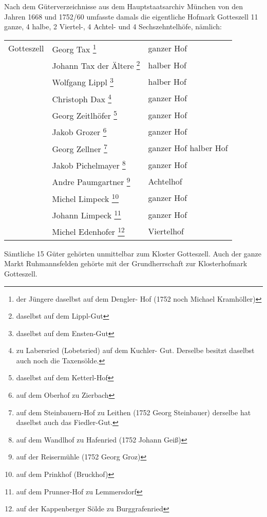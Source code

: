 \documentclass{book}
\begin{document}
Nach dem Güterverzeichnisse aus dem Hauptstaatsarchiv München von den
Jahren 1668 und 1752/60 umfasste damals die eigentliche Hofmark
Gotteszell 11 ganze, 4 halbe, 2 Viertel-, 4 Achtel- und 4
Sechszehntelhöfe, nämlich:

\begin{longtable}{l|l|l}
Gotteszell & Georg Tax \footnote{der Jüngere daselbst auf dem Dengler-
Hof (1752 noch Michael Kramhöller)} & ganzer Hof\\

& Johann Tax der Ältere \footnote{daselbst auf dem Lippl-Gut} & halber
Hof\\

& Wolfgang Lippl \footnote{daselbst auf dem Ensten-Gut} & halber Hof\\

& Christoph Dax \footnote{zu Labersried (Lobetsried) auf dem Kuchler-
Gut. Derselbe besitzt daselbst auch noch die Taxensölde.} & ganzer Hof\\

& Georg Zeitlhöfer \footnote{daselbst auf dem Ketterl-Hof} & ganzer
Hof\\

& Jakob Grozer \footnote{auf dem Oberhof zu Zierbach} & ganzer Hof\\

& Georg Zellner \footnote{auf dem Steinbauern-Hof zu Leithen (1752 Georg
Steinbauer) derselbe hat daselbst auch das Fiedler-Gut.} & ganzer Hof
halber Hof\\

& Jakob Pichelmayer \footnote{auf dem Wandlhof zu Hafenried (1752 Johann
Geiß)} & ganzer Hof\\

& Andre Paumgartner \footnote{auf der Reisermühle (1752 Georg Groz)} &
Achtelhof\\

& Michel Limpeck \footnote{auf dem Prinkhof (Bruckhof)} & ganzer Hof\\

& Johann Limpeck \footnote{auf dem Prunner-Hof zu Lemmersdorf} & ganzer
Hof\\

& Michel Edenhofer \footnote{auf der Kappenberger Sölde zu
Burggrafenried} & Viertelhof\\
\end{longtable}

Sämtliche 15 Güter gehörten unmittelbar zum Kloster Gotteszell. Auch der
ganze Markt Ruhmannsfelden gehörte mit der Grundherrschaft zur
Klosterhofmark Gotteszell.
\end{document}

